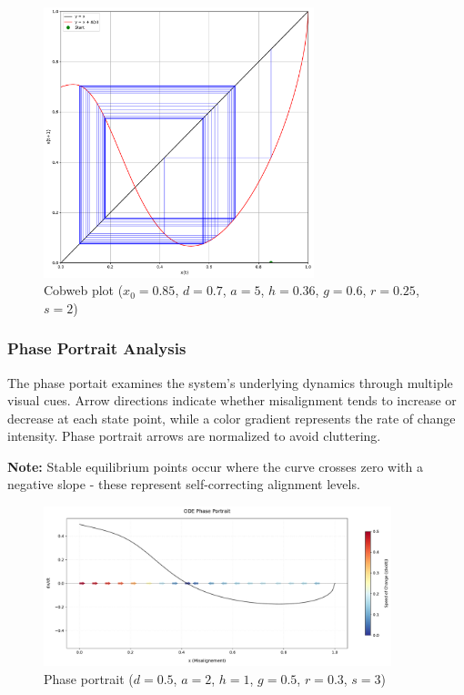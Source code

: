 \documentclass[a4paper, 10pt]{article}
\begin{document}
\begin{figure}[H]
	\centering
	\includegraphics[width=0.7\textwidth]{../images/results/cobweb.pdf}
	\caption{Cobweb plot ($x_0 = 0.85$, $d = 0.7$, $a = 5$, $h = 0.36$, $g = 0.6$, $r = 0.25$, $s = 2$)} %
	\label{fig:cobweb_plot}
\end{figure}

\subsubsection{Phase Portrait Analysis}
The phase portait examines the system's underlying dynamics through multiple visual cues. Arrow directions indicate whether misalignment tends to increase or decrease at each state point, while a color gradient represents the rate of change intensity.
Phase portrait arrows are normalized to avoid cluttering.

\textbf{Note:} Stable equilibrium points occur where the curve crosses zero with a negative slope - these represent self-correcting alignment levels.

\begin{figure}[H]
	\centering
	\includegraphics[width=0.9\textwidth]{../images/results/phase-portrait.pdf}
	\caption{Phase portrait ($d = 0.5$, $a = 2$, $h = 1$, $g = 0.5$, $r = 0.3$, $s = 3$)}
	\label{fig:phase_portrait}
\end{figure}
\end{document}
